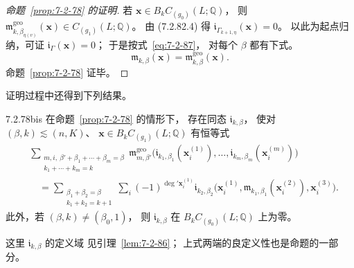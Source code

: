 \begin{proof}[命题~\ref{prop:7-2-78} 的证明]
若 $\mathbf x\in B_kC_{(g_0)}(L;\mathbb Q)$，
则
$\mathfrak m^{\mathrm{geo}}_{k,\beta_{\eta(v)}}
(\mathbf x)\in C_{(g_1)}(L;\mathbb Q)$。
由 (7.2.82.4) 得
$\mathfrak i_{\Gamma_{k+1,\eta}}(\mathbf x)=0$。
以此为起点归纳，可证
$\mathfrak i_\Gamma(\mathbf x)=0$；
于是按式~\eqref{eq:7-2-87}，
对每个 $\beta$ 都有下式。%
\[
\mathfrak m_{k,\beta}(\mathbf x)
=\mathfrak m^{\mathrm{geo}}_{k,\beta}(\mathbf x).
\]
命题~\ref{prop:7-2-78} 证毕。
\end{proof}

证明过程中还得到下列结果。
\begin{proposition}{7.2.78bis}\label{prop:7-2-78bis}
在命题~\ref{prop:7-2-78} 的情形下，
存在同态 $\mathfrak i_{k,\beta}$，
使对
$(\beta,k)\lesssim(n,K)$、
$\mathbf x\in B_kC_{(g_1)}(L;\mathbb Q)$
有恒等式
\begin{equation*}
\begin{aligned}
&\sum_{\substack{m,i,\ \beta'+\beta_1+\cdots+\beta_m=\beta\\
                   k_1+\cdots+k_m=k}}
\mathfrak m^{\mathrm{geo}}_{m,\beta'}
\bigl(\mathfrak i_{k_1,\beta_1}(\mathbf x_i^{(1)}),
\ldots,
\mathfrak i_{k_m,\beta_m}(\mathbf x_i^{(m)})\bigr)\\
&\quad=
\sum_{\substack{\beta_1+\beta_2=\beta\\
                   k_1+k_2=k+1}}
\sum_i(-1)^{\deg'\mathbf x_i^{(1)}}
\mathfrak i_{k_2,\beta_2}
\bigl(\mathbf x_i^{(1)},
\mathfrak m_{k_1,\beta_1}(\mathbf x_i^{(2)}),
\mathbf x_i^{(3)}\bigr).
\end{aligned}
\end{equation*}
此外，若 $(\beta,k)\ne(\beta_0,1)$，
则 $\mathfrak i_{k,\beta}$ 在
$B_kC_{(g_0)}(L;\mathbb Q)$ 上为零。
\end{proposition}
这里 $\mathfrak i_{k,\beta}$ 的定义域
见引理~\ref{lem:7-2-86}；
上式两端的良定义性也是命题的一部分。

